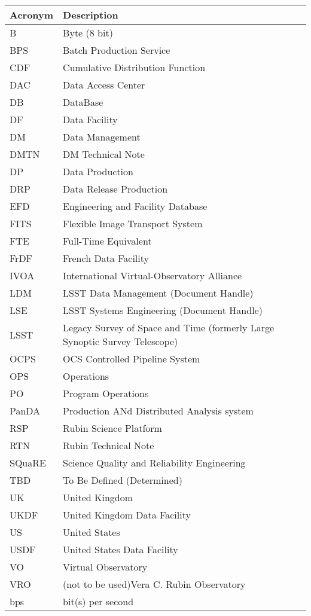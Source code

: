 \addtocounter{table}{-1}
\begin{longtable}{p{}p{}}\hline
\textbf{Acronym} & \textbf{Description}  \\\hline

B & Byte (8 bit) \\\hline
BPS & Batch Production Service \\\hline
CDF & Cumulative Distribution Function \\\hline
DAC & Data Access Center \\\hline
DB & DataBase \\\hline
DF & Data Facility \\\hline
DM & Data Management \\\hline
DMTN & DM Technical Note \\\hline
DP & Data Production \\\hline
DRP & Data Release Production \\\hline
EFD & Engineering and Facility Database \\\hline
FITS & Flexible Image Transport System \\\hline
FTE & Full-Time Equivalent \\\hline
FrDF & French Data Facility \\\hline
IVOA & International Virtual-Observatory Alliance \\\hline
LDM & LSST Data Management (Document Handle) \\\hline
LSE & LSST Systems Engineering (Document Handle) \\\hline
LSST & Legacy Survey of Space and Time (formerly Large Synoptic Survey Telescope) \\\hline
OCPS & OCS Controlled Pipeline System \\\hline
OPS & Operations \\\hline
PO & Program Operations \\\hline
PanDA &  Production ANd Distributed Analysis system \\\hline
RSP & Rubin Science Platform \\\hline
RTN & Rubin Technical Note \\\hline
SQuaRE & Science Quality and Reliability Engineering \\\hline
TBD & To Be Defined (Determined) \\\hline
UK & United Kingdom \\\hline
UKDF & United Kingdom Data Facility \\\hline
US & United States \\\hline
USDF & United States Data Facility \\\hline
VO & Virtual Observatory \\\hline
VRO & (not to be used)Vera C. Rubin Observatory \\\hline
bps & bit(s) per second \\\hline
\end{longtable}
